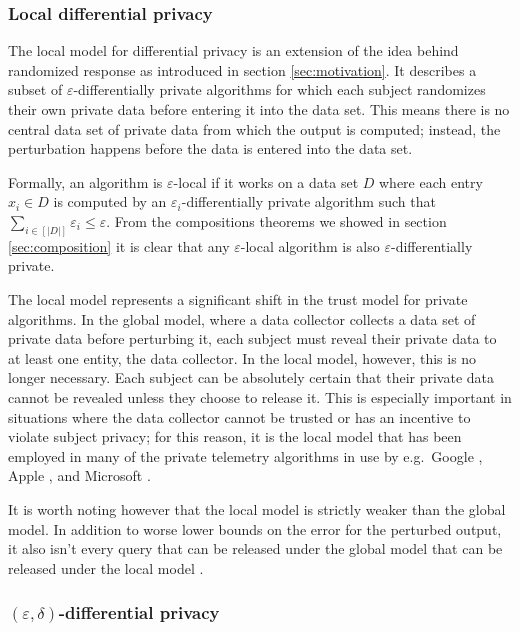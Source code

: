 \documentclass[a4paper,12pt]{article}
\renewcommand{\epsilon}{\varepsilon}
\begin{document}
\subsubsection{Local differential privacy}

The local model for differential privacy \cite{kasiv_localdiff} is an extension of the idea behind randomized response as introduced in section \ref{sec:motivation}. It describes a subset of $\epsilon$-differentially private algorithms for which each subject randomizes their own private data before entering it into the data set. This means there is no central data set of private data from which the output is computed; instead, the perturbation happens before the data is entered into the data set.

Formally, an algorithm is $\epsilon$-local if it works on a data set $D$ where each entry $x_i \in D$ is computed by an $\epsilon_i$-differentially private algorithm such that $\sum_{i\in\left[|D|\right]} \epsilon_i \leq \epsilon$. From the compositions theorems we showed in section \ref{sec:composition} it is clear that any $\epsilon$-local algorithm is also $\epsilon$-differentially private.

The local model represents a significant shift in the trust model for private algorithms. In the global model, where a data collector collects a data set of private data before perturbing it, each subject must reveal their private data to at least one entity, the data collector. In the local model, however, this is no longer necessary. Each subject can be absolutely certain that their private data cannot be revealed unless they choose to release it. This is especially important in situations where the data collector cannot be trusted or has an incentive to violate subject privacy; for this reason, it is the local model that has been employed in many of the private telemetry algorithms in use by e.g.\ Google \cite{google_rappor}, Apple \cite{apple_differential}, and Microsoft \cite{microsoft_telemetry}.

It is worth noting however that the local model is strictly weaker than the global model. In addition to worse lower bounds on the error for the perturbed output, it also isn't every query that can be released under the global model that can be released under the local model \cite[sec.~12.1]{dwork_privacybook}.

\subsubsection{$(\epsilon, \delta)$-differential privacy \label{sec:variant_eps_delta}}
\end{document}
